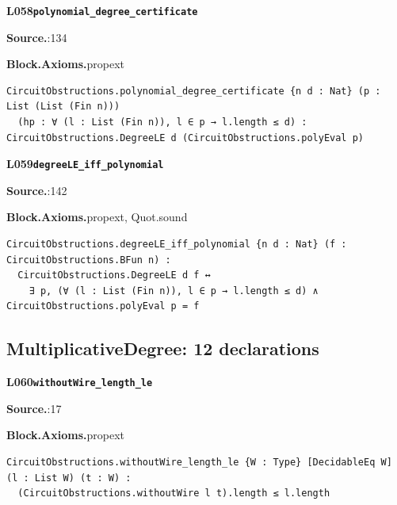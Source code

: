\par\medskip\noindent\begin{minipage}{\textwidth}
{\small\bfseries L058\enspace\texttt{polynomial\_degree\_certificate}\par}
{\footnotesize\raggedright\textbf{Source.}\enspace{}:134\par
\textbf{Block.}\quad\textbf{Axioms.}\enspace propext\par}\nopagebreak
\begin{lstlisting}
CircuitObstructions.polynomial_degree_certificate {n d : Nat} (p : List (List (Fin n)))
  (hp : ∀ (l : List (Fin n)), l ∈ p → l.length ≤ d) : CircuitObstructions.DegreeLE d (CircuitObstructions.polyEval p)
\end{lstlisting}
\end{minipage}\par

\par\medskip\noindent\begin{minipage}{\textwidth}
{\small\bfseries L059\enspace\texttt{degreeLE\_iff\_polynomial}\par}
{\footnotesize\raggedright\textbf{Source.}\enspace{}:142\par
\textbf{Block.}\quad\textbf{Axioms.}\enspace propext, Quot.sound\par}\nopagebreak
\begin{lstlisting}
CircuitObstructions.degreeLE_iff_polynomial {n d : Nat} (f : CircuitObstructions.BFun n) :
  CircuitObstructions.DegreeLE d f ↔
    ∃ p, (∀ (l : List (Fin n)), l ∈ p → l.length ≤ d) ∧ CircuitObstructions.polyEval p = f
\end{lstlisting}
\end{minipage}\par

\subsection*{MultiplicativeDegree: 12 declarations}
\par\medskip\noindent\begin{minipage}{\textwidth}
{\small\bfseries L060\enspace\texttt{withoutWire\_length\_le}\par}
{\footnotesize\raggedright\textbf{Source.}\enspace{}:17\par
\textbf{Block.}\quad\textbf{Axioms.}\enspace propext\par}\nopagebreak
\begin{lstlisting}
CircuitObstructions.withoutWire_length_le {W : Type} [DecidableEq W] (l : List W) (t : W) :
  (CircuitObstructions.withoutWire l t).length ≤ l.length
\end{lstlisting}
\end{minipage}\par

